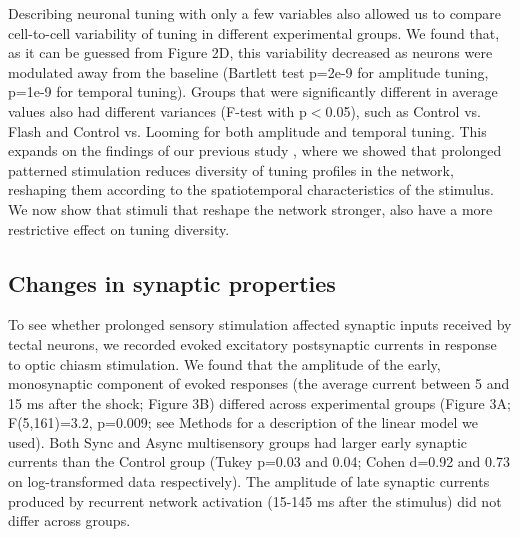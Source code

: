 \documentclass{article}
\begin{document}

Describing neuronal tuning with only a few variables also allowed us to compare cell-to-cell variability of tuning in different experimental groups. We found that, as it can be guessed from Figure 2D, this variability decreased as neurons were modulated away from the baseline (Bartlett test p=2e-9 for amplitude tuning, p=1e-9 for temporal tuning). Groups that were significantly different in average values also had different variances (F-test with p$<$0.05), such as Control vs. Flash and Control vs. Looming for both amplitude and temporal tuning. This expands on the findings of our previous study \citep{ciarleglio2015}, where we showed that prolonged patterned stimulation reduces diversity of tuning profiles in the network, reshaping them according to the spatiotemporal characteristics of the stimulus. We now show that stimuli that reshape the network stronger, also have a more restrictive effect on tuning diversity.

\subsection*{Changes in synaptic properties}

To see whether prolonged sensory stimulation affected synaptic inputs received by tectal neurons, we recorded evoked excitatory postsynaptic currents in response to optic chiasm stimulation. We found that the amplitude of the early, monosynaptic component of evoked responses (the average current between 5 and 15 ms after the shock; Figure 3B) differed across experimental groups (Figure 3A; F(5,161)=3.2, p=0.009; see Methods for a description of the linear model we used). Both Sync and Async multisensory groups had larger early synaptic currents than the Control group (Tukey p=0.03 and 0.04; Cohen d=0.92 and 0.73 on log-transformed data respectively). The amplitude of late synaptic currents produced by recurrent network activation (15-145 ms after the stimulus) did not differ across groups.
\end{document}
